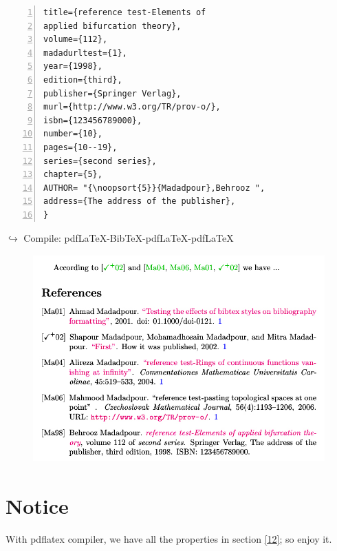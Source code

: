 \documentclass{article}
\begin{document}
\begin{latin}
\begin{Verbatim}[numbers=left,fontsize=\bf,commandchars=\&\#\*,baselinestretch=1,firstnumber=1,formatcom=\color{green!50!black}]
title={reference test-Elements of
applied bifurcation theory},
volume={112},
madadurltest={1},
year={1998},
edition={third},
publisher={Springer Verlag},
murl={http://www.w3.org/TR/prov-o/},
isbn={123456789000},
number={10},
pages={10--19},
series={second series},
chapter={5},
AUTHOR= "{\noopsort{5}}{Madadpour},Behrooz ",
address={The address of the publisher},
}
\end{Verbatim}
\begin{latin}
{\color{blue}$\hookrightarrow$ Compile: pdfLaTeX-BibTeX-pdfLaTeX-pdfLaTeX}
\end{latin}
\begin{figure}[H]
\centering
\includegraphics[width=\textwidth,height=8cm]{image/sh13}
\end{figure}
\section*{Notice}
With pdflatex compiler, we have all the properties in section \ref{12}; so enjoy it.
\end{latin}
\end{document}
